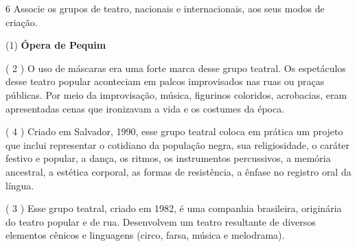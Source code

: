 \begin{escolha}

\num{6} Associe os grupos de teatro, nacionais e internacionais, aos seus modos de criação.

(1)  \textbf{Ópera de Pequim}


( 2 ) O uso de máscaras era uma forte marca desse grupo teatral. Os
espetáculos desse teatro popular aconteciam em palcos improvisados nas
ruas ou praças públicas. Por meio da improvisação, música, figurinos
coloridos, acrobacias, eram apresentadas cenas que ironizavam a vida e
os costumes da época.


( 4 ) Criado em Salvador, 1990, esse grupo teatral coloca em prática um
projeto que inclui representar o cotidiano da população negra, sua
religiosidade, o caráter festivo e popular, a dança, os ritmos, os
instrumentos percussivos, a memória ancestral, a estética corporal, as
formas de resistência, a ênfase no registro oral da língua.


( 3 ) Esse grupo teatral, criado em 1982, é uma companhia brasileira,
originária do teatro popular e de rua. Desenvolvem um teatro resultante
de diversos elementos cênicos e linguagens (circo, farsa, música e
melodrama).



\end{escolha}

